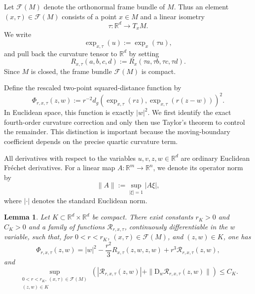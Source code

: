 \documentclass[11pt]{article}
\newtheorem{lemma}[theorem]{Lemma}
\theoremstyle{remark}
\numberwithin{equation}{section}
\begin{document}
Let $\mathcal F(M)$ denote the orthonormal frame bundle of $M$.  Thus an
element $(x,\tau)\in\mathcal F(M)$ consists of a point $x\in M$ and a
linear isometry
\[
\tau:\mathbb R^d\longrightarrow T_xM.
\]
We write
\[
\exp_{x,\tau}(u):=\exp_x(\tau u),
\]
and pull back the curvature tensor to $\mathbb R^d$ by setting
\[
R_{x,\tau}(a,b,c,d)
:=
R_x(\tau a,\tau b,\tau c,\tau d).
\]
Since $M$ is closed, the frame bundle $\mathcal F(M)$ is compact.

Define the rescaled two-point squared-distance function by
\[
\Phi_{r,x,\tau}(z,w)
:=
r^{-2}d_g\!\left(
\exp_{x,\tau}(rz),
\exp_{x,\tau}(r(z-w))
\right)^2.
\]
In Euclidean space, this function is exactly $|w|^2$.  We first identify
the exact fourth-order curvature correction and only then use Taylor's
theorem to control the remainder.  This distinction is important because
the moving-boundary coefficient depends on the precise quartic curvature
term.

All derivatives with respect to the variables
$u,v,z,w\in\mathbb R^d$ are ordinary Euclidean Fréchet derivatives.
For a linear map $A:\mathbb R^m\to\mathbb R^n$, we denote its operator
norm by
\[
\|A\|
:=
\sup_{|\xi|=1}|A\xi|,
\]
where $|\cdot|$ denotes the standard Euclidean norm.


\begin{lemma}
\label{lem:chord-expansion}
Let $K\subset\mathbb R^d\times\mathbb R^d$ be compact.
There exist constants $r_K>0$ and $C_K>0$ and a family of functions
$\mathcal R_{r,x,\tau}$, continuously differentiable in the $w$ variable,
such that, for
$0<r<r_K$, $(x,\tau)\in\mathcal F(M)$, and $(z,w)\in K$,
one has
\[
\Phi_{r,x,\tau}(z,w)
=
|w|^2
-\frac{r^2}{3}R_{x,\tau}(z,w,z,w)
+r^3\mathcal R_{r,x,\tau}(z,w),
\]
and
\[
\sup_{\substack{
0<r<r_K,\ (x,\tau)\in\mathcal F(M)\\
(z,w)\in K
}}
\left(
|\mathcal R_{r,x,\tau}(z,w)|
+
\|\mathrm D_w\mathcal R_{r,x,\tau}(z,w)\|
\right)
\le C_K.
\]
\end{lemma}
\end{document}
